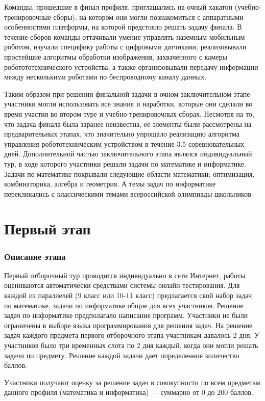 \documentclass[a4paper,12pt,oneside]{book}
\begin{document}
Команды, прошедшие в финал профиля, приглашались на очный хакатон
(учебно-тренировочные сборы), на котором они могли познакомиться с
аппаратными  особенностями платформы, на которой предстояло решать
задачу финала. В течение сборов команды оттачивали умение управлять
наземным мобильным роботом,  изучали специфику работы с цифровыми
датчиками, реализовывали простейшие алгоритмы обработки изображения,
захваченного с камеры роботототехнического устройства, а также
организовывали передачу информации между несколькими роботами по
беспроводному каналу данных.

Таким образом при решении финальной задачи в очном заключительном
этапе участники могли использовать все знания и наработки, которые они
сделали во  время участия во втором туре и учебно-тренировочных
сборах. Несмотря на то, что задача финала была заранее неизвестна, ее
элементы были рассмотрены на  предварительных этапах, что значительно
упрощало реализацию алгоритма управления робототехническим устройством
в течение 3.5 соревновательных дней.  Дополнительной частью
заключительного этапа являлся индивидуальный тур, в ходе которого
участники решали задачи по математике и информатике.  Задачи по
математике покрывали следующие области математики: оптимизация,
комбинаторика, алгебра и геометрия. А темы задач по информатике
перекликались с классическими темами всероссийской олимпиады
школьников.

\part{Первый этап}
\newpage
\section*{Описание этапа}

Первый отборочный тур проводится индивидуально в сети Интернет,
работы оцениваются автоматически средствами системы
онлайн-тестирования.
Для каждой из параллелей (9 класс или 10-11
класс)
предлагается свой набор задач по математике, задачи по информатике общие
для всех участников. Решение задач по информатике предполагало
написание программ. Участники не были ограничены в выборе языка программирования для
решения задач. На решение
задач каждого предмета первого отборочного этапа участникам давалось 2
дня. У участников было три временных слота по 2 дня каждый, когда они
могли решать задачи по предмету. Решение каждой задачи дает
определенное количество баллов.

Участники получают оценку за решение задач
в совокупности по всем предметам данного профиля (математика и
информатика) --- суммарно от 0 до 200 баллов.
\end{document}
